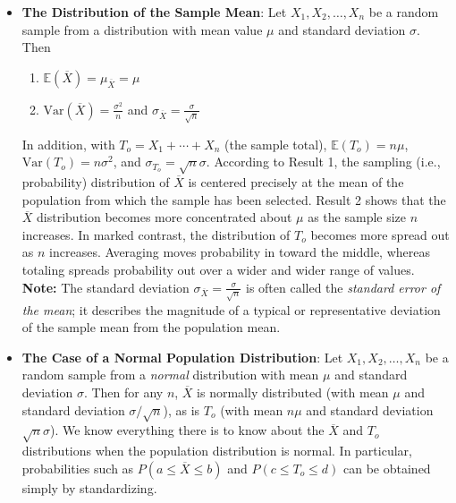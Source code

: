 \documentclass{report}
\begin{document}
\begin{itemize}
        \item \textbf{The Distribution of the Sample Mean}:
            Let \(X_1, X_2, \ldots, X_n\) be a random sample from a distribution with mean value \(\mu\) and standard deviation \(\sigma\). Then
            \begin{enumerate}
                \item \(\mathbb{E}(\overline{X}) = \mu_{\overline{X}} = \mu\)
                \item \(\text{Var}(\overline{X}) = \frac{\sigma^2}{n}\) and \(\sigma_{\overline{X}} = \frac{\sigma}{\sqrt{n}}\)
            \end{enumerate}
            In addition, with \(T_o = X_1 + \cdots + X_n\) (the sample total), \(\mathbb{E}(T_o) = n\mu\),
            \bigbreak \noindent 
            \(\text{Var}(T_o) = n\sigma^2\), and \(\sigma_{T_o} = \sqrt{n}\sigma\).
            \bigbreak \noindent 
             According to Result 1, the sampling (i.e., probability) distribution of \(\overline{X}\) is centered precisely at the mean of the population from which the sample has been selected. Result 2 shows that the \(\overline{X}\) distribution becomes more concentrated about \(\mu\) as the sample size \(n\) increases. In marked contrast, the distribution of \(T_o\) becomes more spread out as \(n\) increases. Averaging moves probability in toward the middle, whereas totaling spreads probability out over a wider and wider range of values. 
             \textbf{Note:} The standard deviation \(\sigma_{\overline{X}} = \frac{\sigma}{\sqrt{n}}\) is often called the \textit{standard error of the mean}; it describes the magnitude of a typical or representative deviation of the sample mean from the population mean.
        \item \textbf{The Case of a Normal Population Distribution}:
            Let \(X_1, X_2, \ldots, X_n\) be a random sample from a \textit{normal} distribution with mean \(\mu\) and standard deviation \(\sigma\). Then for any \(n\), \(\overline{X}\) is normally distributed (with mean \(\mu\) and standard deviation \(\sigma / \sqrt{n}\)), as is \(T_o\) (with mean \(n\mu\) and standard deviation \(\sqrt{n}\sigma\)).
            \bigbreak \noindent 
            We know everything there is to know about the \(\overline{X}\) and \(T_o\) distributions when the population distribution is normal. In particular, probabilities such as \(P(a \leq \overline{X} \leq b)\) and \(P(c \leq T_o \leq d)\) can be obtained simply by standardizing. 
            \bigbreak \noindent 

\end{itemize}
\end{document}
